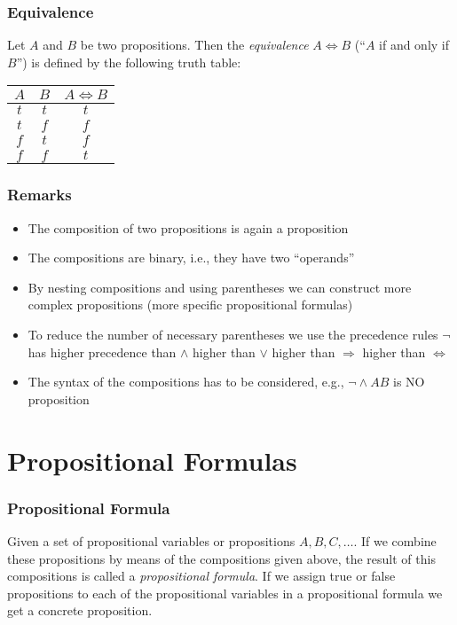 \documentclass{beamer}
\theoremstyle{remark}
\begin{document}
\begin{frame}
\frametitle{Equivalence}
\begin{definition}
Let $A$ and $B$ be two propositions. Then the {\em equivalence} $A \Leftrightarrow B$ (``$A$ if and only if  $B$'') is defined by the following truth table:
\pause
\begin{tabular}{c|c||c}
$A$ & $B$ & $A \Leftrightarrow B$ \\ \hline \hline
$t$ & $t$ \pause & $t$  \\
$t$ & $f$ \pause & $f$  \\
$f$ & $t$ \pause & $f$ \\
$f$ & $f$ \pause & $t$ 
\end{tabular}

\end{definition}
\end{frame}

\begin{frame}
 \frametitle{Remarks}
 
\begin{itemize}
	\item The composition of two propositions is again a proposition
	\pause
	\item The compositions are binary, i.e., they have two ``operands''
	\pause
	\item By nesting compositions and using parentheses we can construct more complex propositions (more specific propositional formulas)
	\pause
	\item To reduce the number of necessary parentheses we use the precedence rules $\lnot$ has higher precedence than $\land$ higher than $\lor$ higher than $\Rightarrow$ higher than $\Leftrightarrow$
	\pause
	\item The syntax of the compositions has to be considered, e.g., $\lnot \land AB$ is NO proposition
\end{itemize}
\end{frame}

\section{Propositional Formulas}
\begin{frame}
\frametitle{Propositional Formula}
\begin{definition}
Given a set of propositional variables or propositions $A, B, C, \ldots$. If we combine these propositions by means of the compositions given above, the result of this compositions is called a {\em propositional formula}. If we assign true or false propositions to each of the propositional variables in a propositional formula we get a concrete proposition.
\end{definition}
\end{frame}
\end{document}
